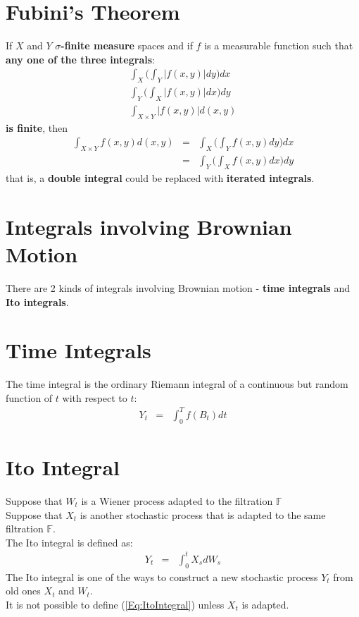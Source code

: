 \section{Fubini's Theorem}
If $X$ and $Y$ \textbf{\color{blue}$\sigma$-finite measure} spaces and if $f$ is a measurable function such that \textbf{\color{blue}any one of the three integrals}:
\begin{eqnarray}
	\int_{X}\Bigg(\int_{Y}\vert f(x, y)\vert dy\Bigg)dx\\
	\int_{Y}\Bigg(\int_{X}\vert f(x, y)\vert dx\Bigg)dy\\
	\int_{X\times Y}\vert f(x, y)\vert d(x,y)
\end{eqnarray}
\textbf{\color{blue}is finite}, then
\begin{eqnarray}
	\int_{X\times Y}f(x, y)d(x, y) &=&
	\int_{X}\Bigg(\int_{Y}f(x, y) dy\Bigg)dx\\
	&=& \int_{Y}\Bigg(\int_{X}f(x, y) dx\Bigg)dy
\end{eqnarray}
that is, a \textbf{\color{blue}double integral} could be replaced with \textbf{\color{blue}iterated integrals}.

\section{Integrals involving Brownian Motion}

There are 2 kinds of integrals involving Brownian motion - \textbf{\color{blue}time integrals} and \textbf{\color{blue}Ito integrals}.

\section{Time Integrals}
The time integral is the ordinary Riemann integral of a continuous but random function of $t$ with respect to $t$:
\begin{eqnarray}
	Y_{t} &=& \int_{0}^{T}{f(B_{t})}dt
\end{eqnarray}

\section{Ito Integral}

Suppose that $W_{t}$ is a Wiener process adapted to the filtration $\mathbb{F}$\\
Suppose that $X_{t}$ is another stochastic process that is adapted to the same filtration $\mathbb{F}$.\\
The Ito integral is defined as:
\begin{eqnarray}
	\label{Eq:ItoIntegral}
	Y_{t} &=& \int_{0}^{t}X_{s}dW_{s}
\end{eqnarray}
The Ito integral is one of the ways to construct a new stochastic process $Y_{t}$ from old ones $X_{t}$ and $W_{t}$.\\
It is not possible to define (\ref{Eq:ItoIntegral}) unless $X_{t}$ is adapted.

